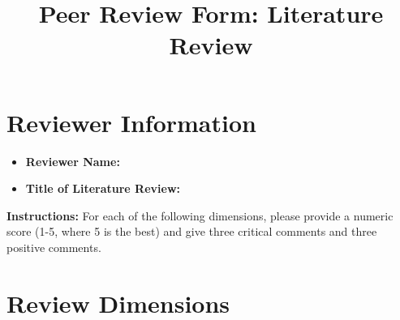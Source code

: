 \documentclass[12pt]{article}
\title{Peer Review Form: Literature Review}
\date{}
\begin{document}
\maketitle

\section*{Reviewer Information}
\begin{itemize}
    \item \textbf{Reviewer Name:} \underline{\hspace{8cm}}
    \item \textbf{Title of Literature Review:} \underline{\hspace{8cm}}
\end{itemize}

\vspace{0.5cm}

\noindent \textbf{Instructions:} For each of the following dimensions, please provide a numeric score (1-5, where 5 is the best) and give three critical comments and three positive comments.

\vspace{0.5cm}

\section*{Review Dimensions}
\end{document}
